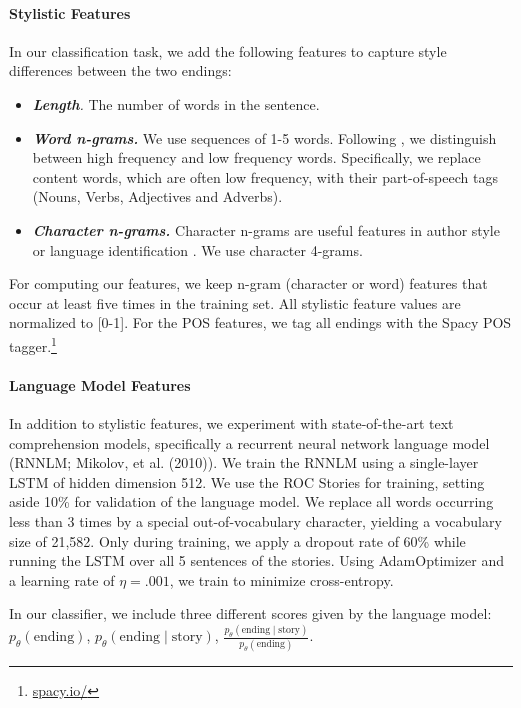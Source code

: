 \documentclass[11pt]{article}
\begin{document}
\paragraph{Stylistic Features}
In our classification task, we add the following features to capture style differences between the two endings:
\begin{itemize}
\item\textit{\textbf{Length}.} The number of words in the sentence.
\item\textit{\textbf{Word n-grams.}} We use sequences of 1-5 words. Following \cite{Tsur:2010,Schwartz:2013}, we distinguish between high frequency and low frequency words. 
Specifically, we replace content words, which are often low frequency, with their part-of-speech tags (Nouns, Verbs, Adjectives and Adverbs).
\item\textit{\textbf{Character n-grams.}} Character n-grams are useful features in author style \cite{Stamatatos:2009} or language identification \cite{lui2011cross}.
We use character 4-grams.
\end{itemize}
For computing our features, we keep n-gram (character or word) features that occur at least five times in the training set.
All stylistic feature values are normalized to [0-1].
For the POS features, we tag all endings with the Spacy POS tagger.\footnote{\url{spacy.io/}}

\paragraph{Language Model Features}
In addition to stylistic features, we experiment with state-of-the-art text comprehension models, specifically a recurrent neural network language model (RNNLM; Mikolov, et al. (2010)\nocite{mikolov2010recurrent}).
We train the RNNLM using a single-layer LSTM \cite{hochreiter1997long} of hidden dimension 512.
We use the ROC Stories for training, setting aside 10\% for validation of the language model. 
We replace all words occurring less than 3 times by a special out-of-vocabulary character, yielding a vocabulary size of 21,582.
Only during training, we apply a dropout rate of 60\% while running the LSTM over all 5 sentences of the stories. 
Using AdamOptimizer \cite{kingma2014adam} and a learning rate of
$\eta=.001$, we train to minimize cross-entropy.

In our classifier, we include three different scores given by the language model:
$p_\theta(\textrm{ending})$, $
p_\theta(\textrm{ending} \mid \textrm{story})$, $
\frac{p_\theta(\textrm{ending} \mid \textrm{story})}{p_\theta(\textrm{ending})}$.
\end{document}

